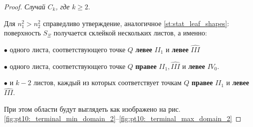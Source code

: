 \begin{proof}
\textit{Случай $C_k$, где $k\geq2$}. 

Для $n_1^2 > n_2^2$ справедливо утверждение, аналогичное \ref{st:stat_leaf_shapes}:
поверхность $S_\Xi$ получается склейкой нескольких листов, 
а именно:

$\bullet$ одного листа, соответствующего точке $Q$ \textbf{левее} $II_1$ и \textbf{левее} $\widehat{III}$

$\bullet$ одного листа, соответствующего точке $Q$ \textbf{правее} $II_1, \widehat{III}$ и \textbf{левее} $IV_0$.

$\bullet$ и $k-2$ листов, каждый из которых соответствует точкам $Q$   \textbf{правее} $II_1$ и \textbf{левее} $\widehat{III}$.

При этом области будут выглядеть как  изображено на рис. \ref{fig:pt10:_terminal_min_domain_2}--\ref{fig:pt10:_terminal_max_domain_2}


\end{proof}
